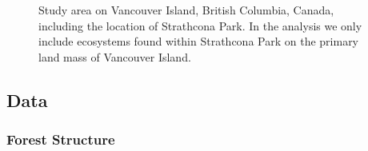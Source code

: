 \documentclass[
]{agujournal2019}
\begin{document}
\label{cell-fig-study}
\begin{figure}[H]


\caption{\label{fig-study}Study area on Vancouver Island, British
Columbia, Canada, including the location of Strathcona Park. In the
analysis we only include ecosystems found within Strathcona Park on the
primary land mass of Vancouver Island.}

\end{figure}%

\subsection{Data}\label{data}

\subsubsection{Forest Structure}\label{forest-structure}
\end{document}
